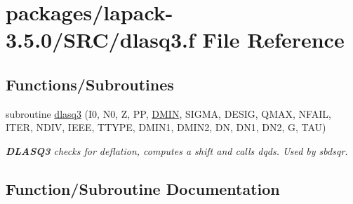 \hypertarget{dlasq3_8f}{}\section{packages/lapack-\/3.5.0/\+S\+R\+C/dlasq3.f File Reference}
\label{dlasq3_8f}
\subsection*{Functions/\+Subroutines}
\begin{DoxyCompactItemize}
\item 
subroutine \hyperlink{dlasq3_8f_a38579c1852f8094a33d0afeed15b2b65}{dlasq3} (I0, N0, Z, P\+P, \hyperlink{zeros_8h_af9a0a96e48b21c87d05acd4ed5117ba0}{D\+M\+I\+N}, S\+I\+G\+M\+A, D\+E\+S\+I\+G, Q\+M\+A\+X, N\+F\+A\+I\+L, I\+T\+E\+R, N\+D\+I\+V, I\+E\+E\+E, T\+T\+Y\+P\+E, D\+M\+I\+N1, D\+M\+I\+N2, D\+N, D\+N1, D\+N2, G, T\+A\+U)
\begin{DoxyCompactList}\small\item\em {\bfseries D\+L\+A\+S\+Q3} checks for deflation, computes a shift and calls dqds. Used by sbdsqr. \end{DoxyCompactList}\end{DoxyCompactItemize}


\subsection{Function/\+Subroutine Documentation}
\hypertarget{dlasq3_8f_a38579c1852f8094a33d0afeed15b2b65}{}
